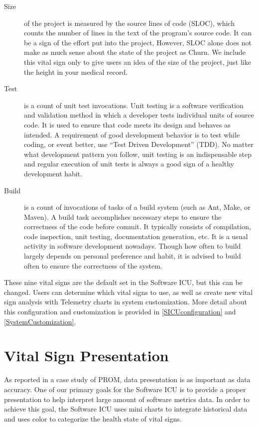 \begin{description}
\item[Size] 
 of the project is measured by the source lines of code (SLOC), which counts the number of lines in the text of the program's source code. It can be a sign of the effort put into the project, However, SLOC alone does not make as much sense about the state of the project as Churn. We include this vital sign only to give users an idea of the size of the project, just like the height in your medical record.

\item[Test] 
is a count of unit test invocations. Unit testing is a software verification and validation method in which a developer tests individual units of source code. It is used to ensure that code meets its design and behaves as intended. A requirement of good development behavior is to test while coding, or event better, use ``Test Driven Development'' (TDD). No matter what development pattern you follow, unit testing is an indispensable step and regular execution of unit tests is always a good sign of a healthy development habit.

\item[Build] 
is a count of invocations of tasks of a build system (such as Ant, Make, or Maven). A build task accomplishes necessary steps to ensure the correctness of the code before commit. It typically consists of compilation, code inspection, unit testing, documentation generation, etc. It is a usual activity in software development nowadays. Though how often to build largely depends on personal preference and habit, it is advised to build often to ensure the correctness of the system.

\end{description}

These nine vital signs are the default set in the Software ICU, but this can be changed. Users can determine which vital signs to use, as well as create new vital sign analysis with Telemetry charts in system customization. More detail about this configuration and customization is provided in \autoref{SICUconfiguration} and \autoref{SystemCustomization}.

\section{Vital Sign Presentation}
\label{presentation}
As reported in a case study of PROM, data presentation is as important as data accuracy\cite{prom09}. One of our primary goals for the Software ICU is to provide a proper presentation to help interpret large amount of software metrics data. In order to achieve this goal, the Software ICU uses mini charts to integrate historical data and uses color to categorize the health state of vital signs.

